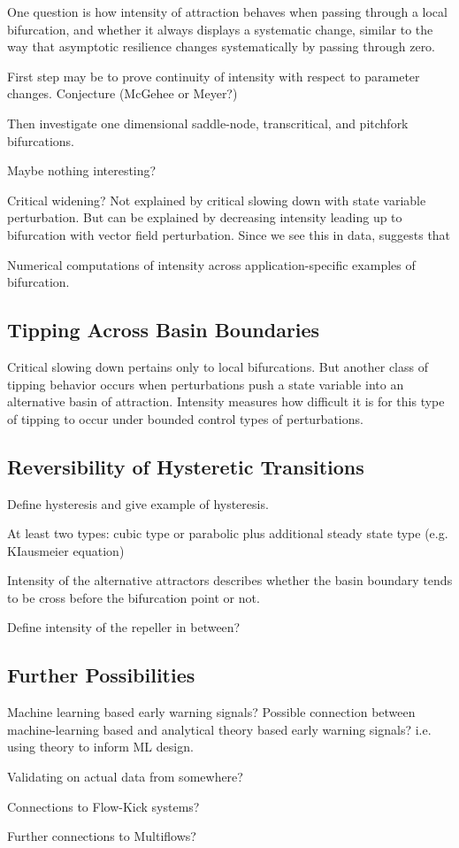 One question is how intensity of attraction behaves when passing through a local bifurcation, and whether it always displays a systematic change, similar to the way that asymptotic resilience changes systematically by passing through zero. 

First step may be to prove continuity of intensity with respect to parameter changes. Conjecture (McGehee or Meyer?)

Then investigate one dimensional saddle-node, transcritical, and pitchfork bifurcations. 

Maybe nothing interesting?

Critical widening? Not explained by critical slowing down with state variable perturbation. But can be explained by decreasing intensity leading up to bifurcation with vector field perturbation. Since we see this in data, suggests that 

Numerical computations of intensity across application-specific examples of bifurcation. 

\subsection{Tipping Across Basin Boundaries}

Critical slowing down pertains only to local bifurcations. But another class of tipping behavior occurs when perturbations push a state variable into an alternative basin of attraction. Intensity measures how difficult it is for this type of tipping to occur under bounded control types of perturbations. 

\subsection{Reversibility of Hysteretic Transitions}

Define hysteresis and give example of hysteresis. 

At least two types: cubic type or parabolic plus additional steady state type (e.g. KIausmeier equation)

Intensity of the alternative attractors describes whether the basin boundary tends to be cross before the bifurcation point or not. 

Define intensity of the repeller in between?

\subsection{Further Possibilities}

Machine learning based early warning signals? Possible connection between machine-learning based and analytical theory based early warning signals? i.e. using theory to inform ML design. 

Validating on actual data from somewhere?

Connections to Flow-Kick systems?

Further connections to Multiflows?

